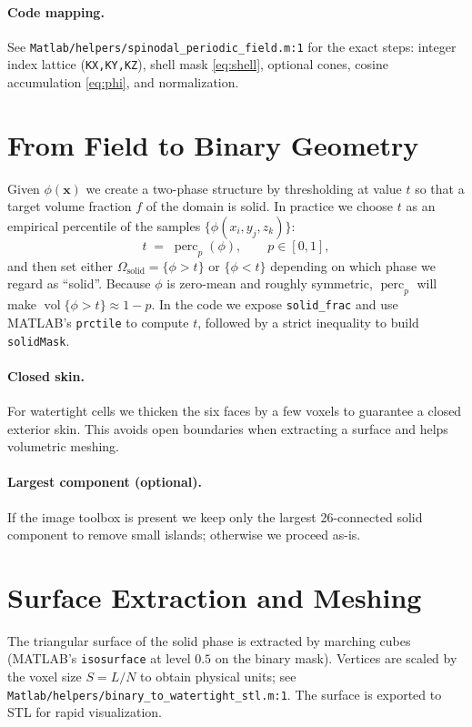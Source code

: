 \documentclass[11pt,a4paper]{article}
\newcommand{\vx}{\bm{x}}
\begin{document}
\paragraph{Code mapping.} See \texttt{Matlab/helpers/spinodal\_periodic\_field.m:1} for the exact steps: integer index lattice (\texttt{KX,KY,KZ}), shell mask \eqref{eq:shell}, optional cones, cosine accumulation \eqref{eq:phi}, and normalization.

\section{From Field to Binary Geometry}
Given $\phi(\vx)$ we create a two-phase structure by thresholding at value $t$ so that a target volume fraction $f$ of the domain is solid. In practice we choose $t$ as an empirical percentile of the samples $\{\phi(x_i,y_j,z_k)\}$:
\begin{equation}
\label{eq:percentile}
 t\;=\;\operatorname{perc}_{p}(\phi),\qquad p\in[0,1],
\end{equation}
and then set either $\Omega_{\text{solid}}=\{\phi>t\}$ or $\{\phi<t\}$ depending on which phase we regard as ``solid''. Because $\phi$ is zero-mean and roughly symmetric, $\operatorname{perc}_{p}$ will make $\operatorname{vol}\{\phi>t\}\approx 1-p$. In the code we expose \texttt{solid\_frac} and use MATLAB's \texttt{prctile} to compute $t$, followed by a strict inequality to build \texttt{solidMask}.

\paragraph{Closed skin.} For watertight cells we thicken the six faces by a few voxels to guarantee a closed exterior skin. This avoids open boundaries when extracting a surface and helps volumetric meshing.

\paragraph{Largest component (optional).} If the image toolbox is present we keep only the largest 26-connected solid component to remove small islands; otherwise we proceed as-is.

\section{Surface Extraction and Meshing}
The triangular surface of the solid phase is extracted by marching cubes (MATLAB's \texttt{isosurface} at level $0.5$ on the binary mask). Vertices are scaled by the voxel size $S=L/N$ to obtain physical units; see \texttt{Matlab/helpers/binary\_to\_watertight\_stl.m:1}. The surface is exported to STL for rapid visualization.
\end{document}

